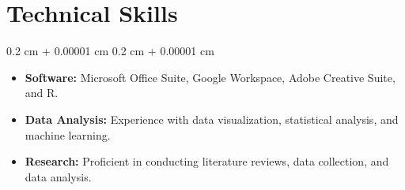 \documentclass[10pt, letterpaper]{article}
\newenvironment{highlights}{
    \begin{itemize}[
        topsep=0.10 cm,
        parsep=0.10 cm,
        partopsep=0pt,
        itemsep=0pt,
        leftmargin=0.4 cm + 10pt
    ]
}{
    \end{itemize}
} %
\newenvironment{onecolentry}{
    \begin{adjustwidth}{
        0.2 cm + 0.00001 cm
    }{
        0.2 cm + 0.00001 cm
    }
}{
    \end{adjustwidth}
} %
\newenvironment{twocolentry}[2][]{
    \onecolentry
    \def\secondColumn{#2}
    \setcolumnwidth{\fill, 4.5 cm}
    \begin{paracol}{2}
}{
    \switchcolumn \raggedleft \secondColumn
    \end{paracol}
    \endonecolentry
} %
\begin{document}
\section{Technical Skills}

\begin{onecolentry}
    \begin{highlights}
        \item \textbf{Software:} Microsoft Office Suite, Google Workspace, Adobe Creative Suite, and R.
        \item \textbf{Data Analysis:} Experience with data visualization, statistical analysis, and machine learning.
        \item \textbf{Research:} Proficient in conducting literature reviews, data collection, and data analysis.
    \end{highlights}
\end{onecolentry}






\end{document}
